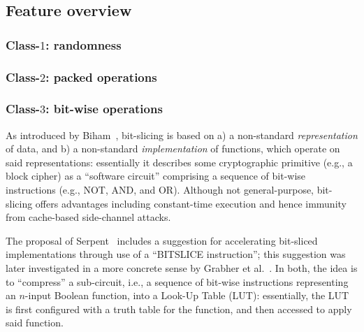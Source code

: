 
\subsection{Feature overview}
\label{sec:bg:feature}


\subsubsection{Class-$1$: randomness}
\label{sec:bg:feature:1}


\subsubsection{Class-$2$: packed                  operations}
\label{sec:bg:feature:2}


\subsubsection{Class-$3$: bit-wise                operations}
\label{sec:bg:feature:3}

As introduced by Biham~\cite{SCARV:Biham:97}, bit-slicing is based on
a) a non-standard {\em representation} of data,
   and
b) a non-standard {\em implementation} of functions, which operate on
   said representations:
essentially it describes some cryptographic primitive (e.g., a block
cipher) as a  ``software circuit'' comprising a sequence of bit-wise 
instructions (e.g., NOT, AND, and OR).  Although not general-purpose,
bit-slicing offers advantages including constant-time execution and 
hence immunity from cache-based side-channel attacks.

The proposal of Serpent~\cite[Page 232]{SCARV:BihAndKnu:98} includes 
a suggestion for accelerating bit-sliced implementations through use 
of a ``BITSLICE instruction''; this suggestion was later investigated 
in a more concrete sense by Grabher et al.~\cite{SCARV:GraGroPag:08}.
In both, the idea is to ``compress'' a sub-circuit, i.e., a sequence 
of bit-wise instructions representing an $n$-input Boolean function,
into a Look-Up Table (LUT): essentially, the LUT is first configured 
with a truth table for the function, and then accessed to apply said
function.  

